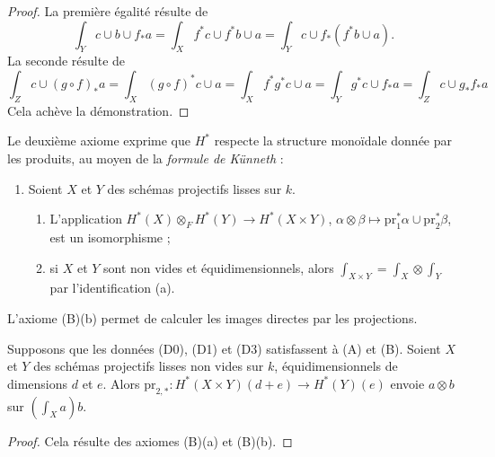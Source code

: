 \begin{proof}
La première égalité résulte de
$$
\int_Y c \cup b \cup f_*a =
\int_X f^*c \cup f^*b \cup a =
\int_Y c \cup f_*(f^*b \cup a).
$$
La seconde résulte de
$$
\int_Z c \cup (g \circ f)_*a = \int_X (g \circ f)^*c \cup a =
\int_X f^* g^* c \cup a = \int_Y g^*c \cup f_*a = \int_Z c \cup g_*f_*a
$$
Cela achève la démonstration.
\end{proof}

\noindent
Le deuxième axiome exprime que $H^*$ respecte la structure monoïdale
donnée par les produits, au moyen de la {\it formule de K\"unneth} :
\begin{enumerate}
\item[(B)] Soient $X$ et $Y$ des schémas projectifs lisses sur $k$.
\begin{enumerate}
\item L'application $H^*(X) \otimes_F H^*(Y) \to H^*(X \times Y)$,
$\alpha \otimes \beta \mapsto \text{pr}_1^*\alpha \cup \text{pr}_2^*\beta$,
est un isomorphisme ;
\item si $X$ et $Y$ sont non vides et équidimensionnels, alors
$\int_{X \times Y} = \int_X \otimes \int_Y$ par l'identification (a).
\end{enumerate}
\end{enumerate}
L'axiome (B)(b) permet de calculer les images directes par les projections.

\begin{lemma}
\label{lemma-pr2star}
Supposons que les données (D0), (D1) et (D3) satisfassent à (A) et (B).
Soient $X$ et $Y$ des schémas projectifs lisses non vides sur $k$,
équidimensionnels de dimensions $d$ et $e$. Alors
$\text{pr}_{2, *} : H^*(X \times Y)(d + e) \to H^*(Y)(e)$ envoie
$a \otimes b$ sur $(\int_X a) b$.
\end{lemma}

\begin{proof}
Cela résulte des axiomes (B)(a) et (B)(b).
\end{proof}

